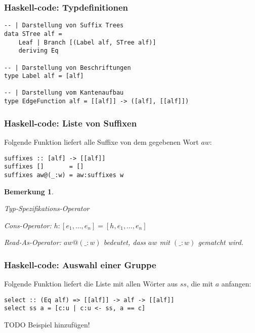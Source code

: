 \documentclass{beamer}
\newtheorem{remark}{Bemerkung}
\begin{document}
\begin{frame}[fragile]
\frametitle{Haskell-code: Typdefinitionen}
\begin{lstlisting}
-- | Darstellung von Suffix Trees
data STree alf =
    Leaf | Branch [(Label alf, STree alf)]
    deriving Eq

-- | Darstellung von Beschriftungen
type Label alf = [alf]

-- | Darstellung vom Kantenaufbau
type EdgeFunction alf = [[alf]] -> ([alf], [[alf]])
\end{lstlisting}
\end{frame}

\begin{frame}[fragile]
\frametitle{Haskell-code: Liste von Suffixen}
Folgende Funktion liefert alle Suffixe von dem gegebenen Wort $aw$:
\begin{lstlisting}
suffixes :: [alf] -> [[alf]]
suffixes []       = []
suffixes aw@(_:w) = aw:suffixes w
\end{lstlisting}
\bigskip
\begin{remark}
\begin{description}[l]
    \item[Operator $(::)$] Typ-Spezifikations-Operator
    \item[Operator $(:)$] Cons-Operator: $h:[e_1, \dots, e_n] = [h, e_1, \dots, e_n]$
    \item[Operator $(@)$] Read-As-Operator: $aw@(\_:w)$ bedeutet, dass $aw$ mit $(\_:w)$ gematcht wird.
\end{description}
\end{remark}
\end{frame}

\begin{frame}[fragile]
\frametitle{Haskell-code: Auswahl einer Gruppe}
Folgende Funktion liefert die Liste mit allen Wörter aus $ss$, die mit $a$ anfangen:
\begin{lstlisting}
select :: (Eq alf) => [[alf]] -> alf -> [[alf]]
select ss a = [c:u | c:u <- ss, a == c]
\end{lstlisting}
TODO Beispiel hinzufügen!
\end{frame}
\end{document}

